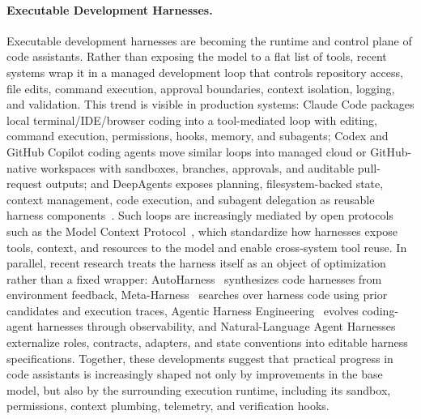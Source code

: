 \documentclass{llmxive}
\begin{document}
\paragraph{Executable Development Harnesses.}
Executable development harnesses are becoming the runtime and control plane of
code assistants. Rather than exposing the model to a flat list of tools, recent
systems wrap it in a managed development loop that controls repository access,
file edits, command execution, approval boundaries, context isolation, logging,
and validation. This trend is visible in production systems: Claude Code
packages local terminal/IDE/browser coding into a tool-mediated loop with
editing, command execution, permissions, hooks, memory, and subagents; Codex and
GitHub Copilot coding agents move similar loops into managed cloud or
GitHub-native workspaces with sandboxes, branches, approvals, and auditable
pull-request outputs; and DeepAgents exposes planning, filesystem-backed state,
context management, code execution, and subagent delegation as reusable harness
components~\citep{claudecode2025,codex2025,deepagents2025,copilotagent2025}.
Such loops are increasingly mediated by open protocols such as the Model Context Protocol~\citep{anthropic2024mcp,hou2025model}, 
which standardize how harnesses expose tools, context, and resources to the model and enable cross-system tool reuse. 
In parallel, recent research treats the harness itself as an object of optimization rather than a fixed wrapper: AutoHarness~\citep{lou2026autoharness} synthesizes
code harnesses from environment feedback, Meta-Harness~\citep{lee2026metaharness} searches over harness
code using prior candidates and execution traces, Agentic Harness Engineering~\citep{lin2026agentic}
evolves coding-agent harnesses through observability, and Natural-Language
Agent Harnesses~\citep{pan2026natural} externalize roles, contracts, adapters, and state conventions
into editable harness specifications. Together, these developments suggest that practical progress in code assistants
is increasingly shaped not only by improvements in the base model, but also by
the surrounding execution runtime, including its sandbox, permissions, context
plumbing, telemetry, and verification hooks.
\end{document}
